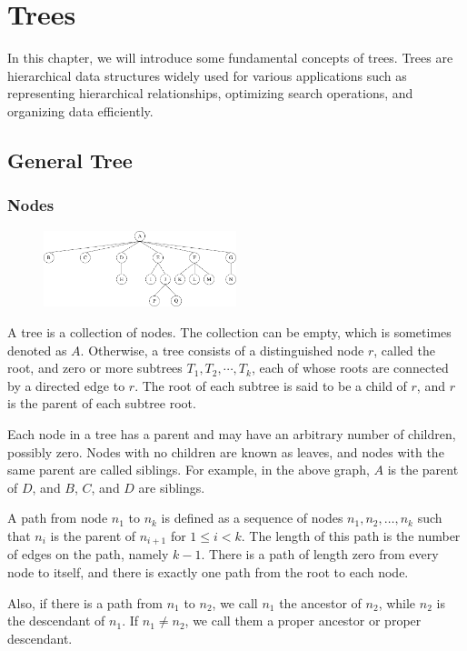 \chapter{Trees}
In this chapter, we will introduce some fundamental concepts of trees. Trees are hierarchical data structures widely used for various applications such as representing hierarchical relationships, optimizing search operations, and organizing data efficiently. 

\section{General Tree}
\subsection{Nodes}
\begin{figure}[H]
  \centering
  \includegraphics[width=0.5\textwidth]{Figure/General-Tree.pdf}
\end{figure}
A tree is a collection of nodes. The collection can be empty, which is sometimes denoted as \(A\). Otherwise, a tree consists of a distinguished node \(r\), called the root, and zero or more subtrees \(T_1, T_2, \cdots, T_k\), each of whose roots are connected by a directed edge to \(r\). The root of each subtree is said to be a child of \(r\), and \(r\) is the parent of each subtree root.

Each node in a tree has a parent and may have an arbitrary number of children, possibly zero. Nodes with no children are known as leaves, and nodes with the same parent are called siblings. For example, in the above graph, \(A\) is the parent of \(D\), and \(B\), \(C\), and \(D\) are siblings.

A path from node \(n_1\) to \(n_k\) is defined as a sequence of nodes \(n_1, n_2, \dots, n_k\) such that \(n_i\) is the parent of \(n_{i+1}\) for \(1 \leq i < k\). The length of this path is the number of edges on the path, namely \(k - 1\). There is a path of length zero from every node to itself, and there is exactly one path from the root to each node.

Also, if there is a path from \(n_1\) to \(n_2\), we call \(n_1\) the ancestor of \(n_2\), while \(n_2\) is the descendant of \(n_1\). If \(n_1 \neq n_2\), we call them a proper ancestor or proper descendant.

